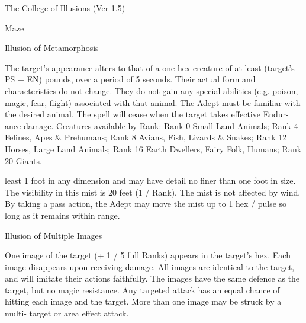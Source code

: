 \begin{Chapter}{The College of Illusions (Ver 1.5)}
\begin{spell}[S-10]{Maze }
\begin{effects}
\end{effects}
\end{spell}

\begin{spell}[S-11]{Illusion of Metamorphosis }

\begin{effects}
 The  target’s  appearance  alters  to  that  of  a 
one  hex  creature  of  at  least  (target’s  PS  +  EN) 
pounds,  over  a  period  of  5  seconds.  Their  actual 
form  and  characteristics  do  not  change.  They  do 
not  gain  any  special  abilities  (e.g.  poison,  magic, 
fear, flight) associated with that animal. The Adept 
must be familiar with the desired animal. The spell 
will  cease  when  the  target  takes  effective  Endur-
ance damage. Creatures available by Rank: Rank 0 
Small  Land  Animals;  Rank  4  Felines,  Apes  \& 
Prehumans;  Rank  8  Avians,  Fish,  Lizards  \& 
Snakes;  Rank  12  Horses,  Large  Land  Animals; 
Rank  16  Earth  Dwellers,  Fairy  Folk,  Humans; 
Rank 20 Giants. 

least  1  foot  in any  dimension  and  may  have  detail 
no finer than one foot in size. The visibility in this 
mist is 20 feet (1 / Rank). The mist is not affected 
by  wind.  By  taking  a  pass  action,  the  Adept  may 
move  the  mist  up  to  1  hex  /  pulse  so  long  as  it 
remains within range. 

\end{effects}
\end{spell}

\begin{spell}[S-13]{Illusion of Multiple Images }

\begin{effects}
One image of the target (+ 1 / 5 full Ranks) 
appears in the target’s hex. Each image disappears 
upon receiving damage. All images are identical to 
the  target,  and  will  imitate  their  actions  faithfully. 
The  images  have  the  same  defence  as  the  target, 
but no magic resistance. Any targeted attack has an 
equal  chance  of  hitting  each  image  and  the  target. 
More  than  one  image  may  be  struck  by  a  multi-
target or area effect attack. 


\end{effects}
\end{spell}
\end{Chapter}
